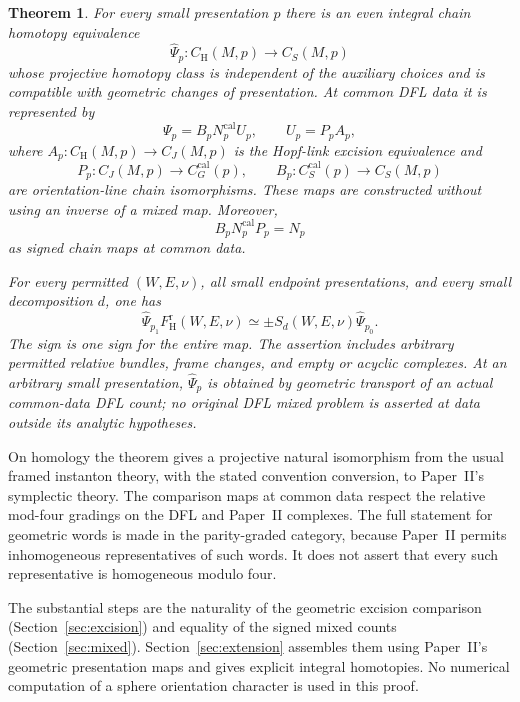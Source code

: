 \documentclass[11pt]{amsart}
\theoremstyle{definition}
\theoremstyle{remark}
\theoremstyle{plain}
\newtheorem{thmletter}{Theorem}
\newcommand{\calib}{\mathrm{cal}}
\newcommand{\CH}{C_{\mathrm H}}
\newcommand{\CJ}{C_J}
\newcommand{\CS}{C_S}
\newcommand{\FH}{F_{\mathrm H}}
\begin{document}
\begin{thmletter}\label{thm:A}
For every small presentation $p$ there is an even integral chain
homotopy equivalence
\[
 \widehat\Psi_p:\CH(M,p)\longrightarrow\CS(M,p)
\]
whose projective homotopy class is independent of the auxiliary
choices and is compatible with geometric changes of presentation.
At common DFL data it is represented by
\begin{equation}\label{eq:actual}
 \Psi_p=B_pN_p^{\calib}U_p,
 \qquad U_p=P_pA_p,
\end{equation}
where $A_p:\CH(M,p)\to\CJ(M,p)$ is the Hopf-link excision
equivalence and
\[
 P_p:\CJ(M,p)\longrightarrow C_G^{\calib}(p),
 \qquad B_p:C_S^{\calib}(p)\longrightarrow\CS(M,p)
\]
are orientation-line chain isomorphisms. These maps are constructed
without using an inverse of a mixed map. Moreover,
\begin{equation}\label{eq:coeff-main}
 B_pN_p^{\calib}P_p=N_p
\end{equation}
as signed chain maps at common data.

For every permitted $(W,E,\nu)$, all small endpoint presentations,
and every small decomposition $d$, one has
\begin{equation}\label{eq:theorem-square}
 \widehat\Psi_{p_1}\FH^{\mathrm r}(W,E,\nu)
 \simeq\pm S_d(W,E,\nu)\widehat\Psi_{p_0}.
\end{equation}
The sign is one sign for the entire map. The assertion includes
arbitrary permitted relative bundles, frame changes, and empty or
acyclic complexes. At an arbitrary small presentation,
$\widehat\Psi_p$ is obtained by geometric transport of an actual
common-data DFL count; no original DFL mixed problem is asserted at
data outside its analytic hypotheses.
\end{thmletter}

On homology the theorem gives a projective natural isomorphism
from the usual framed instanton theory, with the stated convention
conversion, to Paper~II's symplectic theory. The comparison maps at
common data respect the relative mod-four gradings on the DFL and
Paper~II complexes. The full statement for geometric words is made
in the parity-graded category, because Paper~II permits
inhomogeneous representatives of such words. It does not assert
that every such representative is homogeneous modulo four.

The substantial steps are the naturality of the geometric excision
comparison (Section~\ref{sec:excision}) and equality of the signed
mixed counts (Section~\ref{sec:mixed}). Section~\ref{sec:extension}
assembles them using Paper~II's geometric presentation maps and
gives explicit integral homotopies. No numerical computation of a sphere
orientation character is used in this proof.
\end{document}
